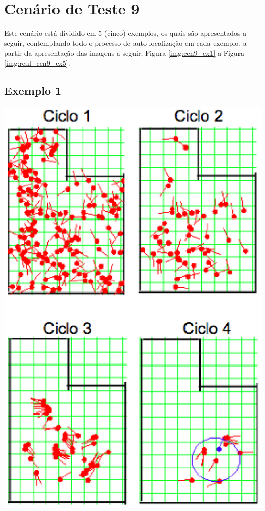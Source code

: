 \section{Cenário de Teste 9}
\label{sec:cenario9}

Este cenário está dividido em 5 (cinco) exemplos, os quais são apresentados a seguir, contemplando todo o processo de auto-localização
em cada exemplo, a partir da apresentação das imagens a seguir, Figura \ref{img:cen9_ex1} a Figura \ref{img:real_cen9_ex5}.

\subsection{Exemplo 1}

{\centering
\includegraphics[scale=0.4]{figuras/cen9_ex1.eps}
\label{img:cen9_ex1}
\par}


